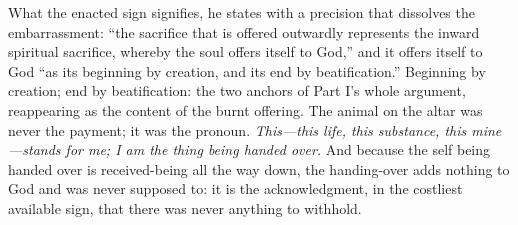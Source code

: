 What the enacted sign signifies, he states with a precision that dissolves the embarrassment: ``the sacrifice that is offered outwardly represents the inward spiritual sacrifice, whereby the soul offers itself to God,'' and it offers itself to God ``as its beginning by creation, and its end by beatification.'' Beginning by creation; end by beatification: the two anchors of Part I's whole argument, reappearing as the content of the burnt offering. The animal on the altar was never the payment; it was the pronoun. \emph{This---this life, this substance, this mine---stands for me; I am the thing being handed over.} And because the self being handed over is received-being all the way down, the handing-over adds nothing to God and was never supposed to: it is the acknowledgment, in the costliest available sign, that there was never anything to withhold.

